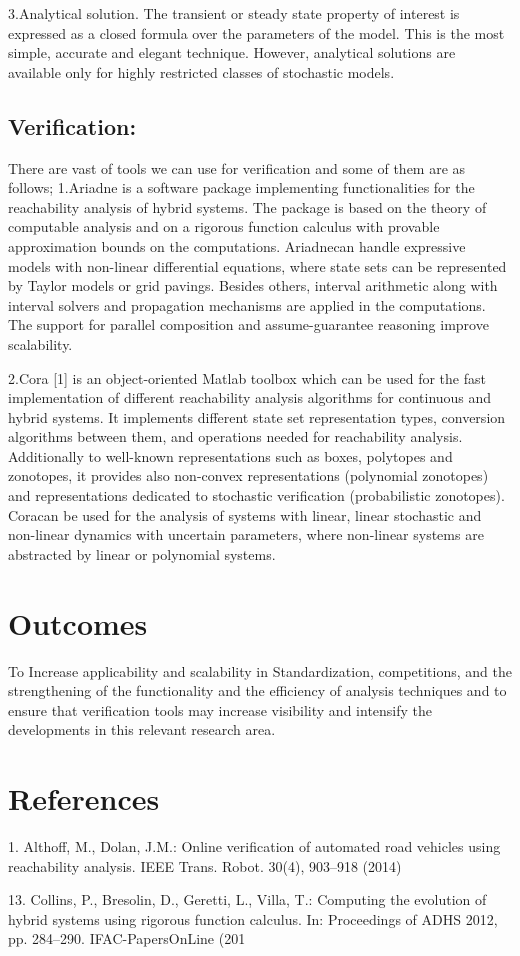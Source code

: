 \documentclass[14pt]{article}
\begin{document}
3.Analytical solution.
 The transient or steady state property of interest is expressed as a
closed formula over the parameters of the model. This is the most simple, accurate
and elegant technique. However, analytical solutions are available only for highly
restricted classes of stochastic models.

\subsection{Verification:}
There are vast of tools we can use for verification  and some of them are as follows;
1.Ariadne  is a software package implementing functionalities for the reachability analysis of hybrid systems. The package is based on the theory of computable analysis and on a rigorous function calculus with provable approximation bounds on the computations. Ariadnecan handle expressive models with non-linear differential equations, where state sets can be represented by Taylor models or grid pavings. Besides others, interval arithmetic along with interval solvers and propagation mechanisms are applied in the computations. The support for parallel composition and assume-guarantee reasoning improve scalability.

2.Cora [1] is an object-oriented Matlab toolbox which can be used for the fast implementation of different reachability analysis algorithms for continuous and hybrid systems. It implements different state set representation types, conversion algorithms between them, and operations needed for reachability analysis. Additionally to well-known representations such as boxes, polytopes and zonotopes, it provides also non-convex representations (polynomial zonotopes) and representations dedicated to stochastic verification (probabilistic zonotopes). Coracan
be used for the analysis of systems with linear, linear stochastic and non-linear dynamics with uncertain parameters, where non-linear systems are abstracted by linear or polynomial systems.

\section{Outcomes}
 To Increase applicability and scalability  in Standardization, competitions, and the strengthening of the functionality and the efficiency of  analysis  techniques and to ensure that verification  tools may increase visibility and  intensify the developments in this relevant research area.

\section{References}
1. Althoff, M., Dolan, J.M.: Online verification of automated road vehicles using reachability analysis. IEEE Trans. Robot. 30(4), 903–918 (2014)

13. Collins, P., Bresolin, D., Geretti, L., Villa, T.: Computing the evolution of hybrid systems using rigorous function calculus. In: Proceedings of ADHS 2012, pp. 284–290. IFAC-PapersOnLine (201
\end{document}
